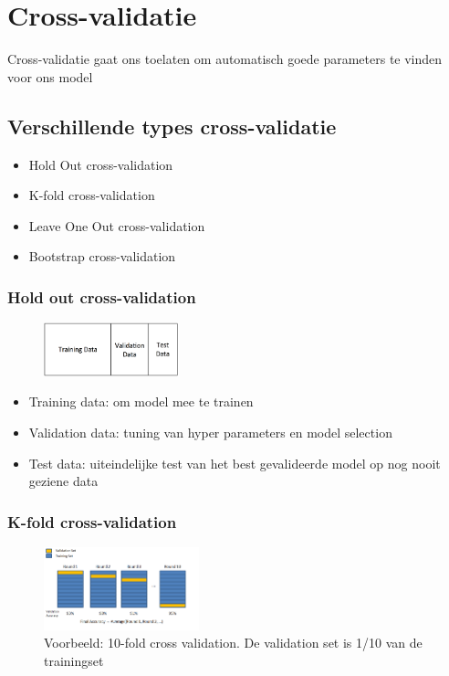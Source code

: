 \documentclass{article}
\begin{document}
\section{Cross-validatie}

Cross-validatie gaat ons toelaten om automatisch goede parameters te vinden voor ons model

\subsection{Verschillende types cross-validatie}

\begin{itemize}
    \item Hold Out cross-validation
    \item K-fold cross-validation
    \item Leave One Out cross-validation
    \item Bootstrap cross-validation
\end{itemize}

\subsubsection{Hold out cross-validation}

\begin{figure}[H]
    \centering
    \includegraphics[width=0.35\textwidth]{cross-validation-holdout.png}
    \caption{}
\end{figure}

\begin{itemize}
    \item Training data: om model mee te trainen
    \item Validation data: tuning van hyper parameters en model selection
    \item Test data: uiteindelijke test van het best gevalideerde model op nog nooit geziene data
\end{itemize}

\subsubsection{K-fold cross-validation}

\begin{figure}[H]
    \centering
    \includegraphics[width=0.4\textwidth]{cross-validation-kfold.png}
    \caption{Voorbeeld: 10-fold cross validation. De validation set is 1/10 van de trainingset}
\end{figure}
\end{document}
